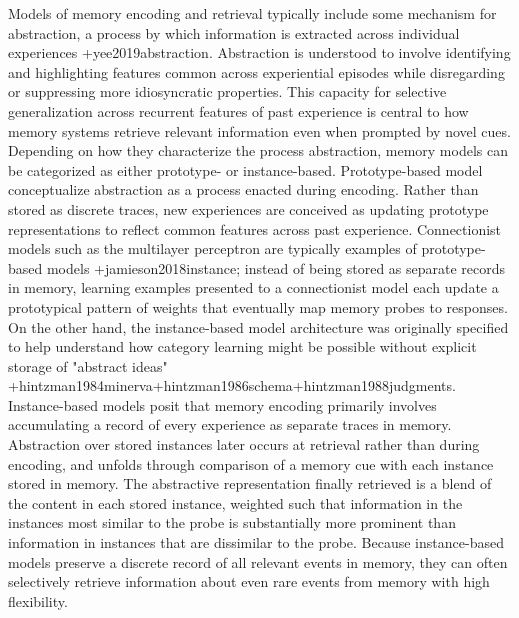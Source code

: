 Models of memory encoding and retrieval typically include some mechanism for abstraction, a process by which information is extracted across individual experiences +{}{}{yee2019abstraction}. Abstraction is understood to involve identifying and highlighting features common across experiential episodes while disregarding or suppressing more idiosyncratic properties. This capacity for selective generalization across recurrent features of past experience is central to how memory systems retrieve relevant information even when prompted by novel cues.\markdownRendererInterblockSeparator
{}Depending on how they characterize the process abstraction, memory models can be categorized as either prototype- or instance-based. Prototype-based model conceptualize abstraction as a process enacted during encoding. Rather than stored as discrete traces, new experiences are conceived as updating prototype representations to reflect common features across past experience. Connectionist models such as the multilayer perceptron are typically examples of prototype-based models +{}{}{jamieson2018instance}; instead of being stored as separate records in memory, learning examples presented to a connectionist model each update a prototypical pattern of weights that eventually map memory probes to responses.\markdownRendererInterblockSeparator
{}On the other hand, the instance-based model architecture was originally specified to help understand how category learning might be possible without explicit storage of "abstract ideas" +{}{}{hintzman1984minerva}+{}{}{hintzman1986schema}+{}{}{hintzman1988judgments}. Instance-based models posit that memory encoding primarily involves accumulating a record of every experience as separate traces in memory. Abstraction over stored instances later occurs at retrieval rather than during encoding, and unfolds through comparison of a memory cue with each instance stored in memory. The abstractive representation finally retrieved is a blend of the content in each stored instance, weighted such that information in the instances most similar to the probe is substantially more prominent than information in instances that are dissimilar to the probe. Because instance-based models preserve a discrete record of all relevant events in memory, they can often selectively retrieve information about even rare events from memory with high flexibility.\markdownRendererInterblockSeparator

